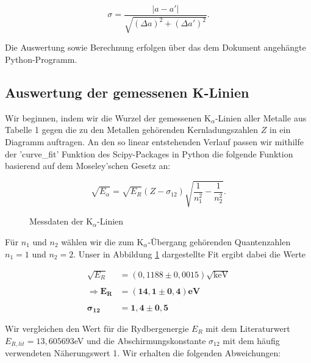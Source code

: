 \documentclass{article}
\begin{document}
\begin{equation}
    \sigma = \frac{|a-a'|}{\sqrt{(\Delta a)^2 + (\Delta a')^2}}.
\end{equation}

Die Auswertung sowie Berechnung erfolgen über das dem Dokument angehängte Python-Programm.

\newpage

\subsection{Auswertung der gemessenen K-Linien}

Wir beginnen, indem wir die Wurzel der gemessenen K$_\alpha$-Linien aller Metalle aus Tabelle 1 gegen die zu den Metallen gehörenden Kernladungszahlen $Z$ in ein Diagramm auftragen. An den so linear entstehenden Verlauf passen wir mithilfe der 'curve\_fit' Funktion des Scipy-Packages in Python die folgende Funktion basierend auf dem Moseley'schen Gesetz an:

\begin{equation}
    \sqrt{E_\alpha} = \sqrt{E_R} (Z - \sigma_{12}) \sqrt{\frac{1}{n_1^2} - \frac{1}{n_2^2}}.
\end{equation}

\begin{figure}[!b]
    \centering
    \caption{Messdaten der K$_\alpha$-Linien}
    \label{fig:Ka_Plot}
\end{figure}

Für $n_1$ und $n_2$ wählen wir die zum K$_\alpha$-Übergang gehörenden Quantenzahlen $n_1 = 1$ und $n_2 = 2$. Unser in Abbildung \ref{fig:Ka_Plot} dargestellte Fit ergibt dabei die Werte

\begin{equation}
    \begin{split}
        \sqrt{E_R} &= (0,1188 \pm 0,0015) \sqrt{\text{keV}} \\ \\
        \Rightarrow \bm{E_R} &\bm{= (14,1 \pm 0,4)} \textbf{eV} \\ \\
        \bm{\sigma_{12}} &\bm{= 1,4 \pm 0,5}
    \end{split}
\end{equation}

\newpage

Wir vergleichen den Wert für die Rydbergenergie $E_R$ mit dem Literaturwert $E_{R,lit} = 13,605693$eV und die Abschirmungskonstante $\sigma_{12}$ mit dem häufig verwendeten Näherungswert 1. Wir erhalten die folgenden Abweichungen:
\end{document}
